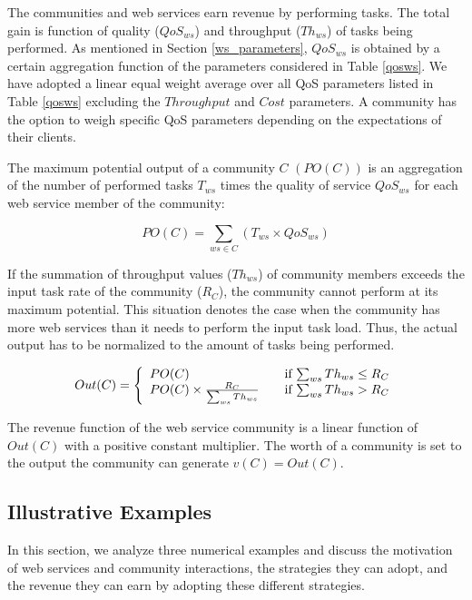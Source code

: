 \documentclass[10pt,journal,cspaper,compsoc]{IEEEtran}
\begin{document}
The communities and web services earn revenue by performing tasks.
The total gain is function of quality ($QoS_{ws}$) and throughput
($Th_{ws}$) of tasks being performed. As mentioned in Section
\ref{ws_parameters}, $QoS_{ws}$ is obtained by a certain
aggregation function of the parameters considered in Table
\ref{qosws}. We have adopted a linear equal weight average over
all QoS parameters listed in Table \ref{qosws} excluding the
$Throughput$ and $Cost$ parameters. A community has the option to
weigh specific QoS parameters depending on the expectations of
their clients.

The maximum potential output of a community $C$ $(PO(C))$  is an
aggregation of the number of performed tasks $T_{ws}$ times the
quality of service $QoS_{ws}$ for each web service member of the
community:

\begin{equation}
PO(C) = \sum_{ws \in C}{(T_{ws} \times QoS_{ws})}
\end{equation}

If the summation of throughput values ($Th_{ws}$) of community
members exceeds the input task rate of the community ($R_C$), the
community cannot perform at its maximum potential. This situation
denotes the case when the community has more web services than it
needs to perform the input task load. Thus, the actual output has
to be normalized to the amount of tasks being performed.

\begin{equation}\label{out_c}
Out(C) = \left\{
  \begin{array}{l l}
    PO(C) & \quad \text{if $\sum_{ws}{Th_{ws}} \leq R_{C}$}\\
    PO(C) \times \frac{R_{C}}{\sum_{ws}{Th_{ws}}} & \quad \text{if $\sum_{ws}{Th_{ws}} > R_{C}$}
  \end{array} \right. 
\end{equation}

The revenue function of the web service community is a linear
function of $Out(C)$ with a positive constant multiplier. The 
worth of a community is set to the output the community 
can generate $v(C) = Out(C)$.

\subsection{Illustrative Examples}

In this section, we analyze three numerical examples and discuss
the motivation of web services and community interactions, the
strategies they can adopt, and the revenue they can earn by
adopting these different strategies.
\end{document}

